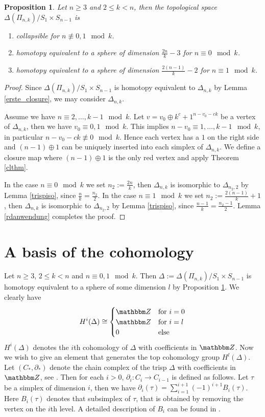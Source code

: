 \documentclass{elsarticle}
\newtheorem{prop}[df]{Proposition}
\def\Z{\mathbbm Z}
\begin{document}
\begin{prop}
\label{mainresult}
Let $n\geq3$ and $2\leq k<n$, then the topological space $\Delta(\Pi_{n,k})/S_1\times S_{n-1}$ is
\begin{enumerate}
\item collapsible for $n\not\equiv 0,1\mod k$.
\item homotopy equivalent to a sphere of dimension $\frac{2n}k-3$ for $n\equiv 0\mod k$.
\item homotopy equivalent to a sphere of dimension $\frac{2(n-1)}k-2$ for $n\equiv 1\mod k$.
\end{enumerate}
\end{prop}
\begin{proof}
Since $\Delta(\Pi_{n,k})/S_1\times S_{n-1}$ is homotopy equivalent to $\Delta_{n,k}$ by Lemma \ref{erste_closure}, we may consider $\Delta_{n,k}$.

Assume we have  $n\equiv 2,\dots,k-1\mod k$. Let $v=v_0\oplus k^c+1^{n-v_0-ck}$ be a vertex of $\Delta_{n,k}$, then we have $v_0\equiv 0,1\mod k$. This implies $n-v_0\equiv 1,\dots,k-1\mod k$, in particular $n-v_0-ck\not\equiv 0\mod k$. Hence each vertex has a $1$ on the right side and $(n-1)\oplus 1$ can be uniquely inserted into each simplex of $\Delta_{n,k}$. We define a closure map where $(n-1)\oplus 1$ is the only red vertex and apply Theorem \ref{clthm}.

In the case $n\equiv 0\mod k$ we set $n_2:=\frac{2n}k$, then $\Delta_{n,k}$ is isomorphic to $\Delta_{n_2,2}$ by Lemma \ref{trispiso}, since $\frac nk=\frac{n_2}2$. In the case $n\equiv 1\mod k$ we set $n_2:=\frac{2(n-1)}k+1$, then $\Delta_{n,k}$ is isomorphic to $\Delta_{n_2,2}$ by Lemma \ref{trispiso}, since $\frac {n-1}k=\frac{n_2-1}2$. Lemma \ref{rdanwendung} completes the proof.
\end{proof}
\section{A basis of the cohomology}
Let $n\geq3$, $2\leq k<n$ and $n\equiv 0,1\mod k$. Then $\Delta:=\Delta(\Pi_{n,k})/S_1\times S_{n-1}$ is homotopy equivalent to a sphere of some dimension $l$ by Proposition \ref{mainresult}. We clearly have 
\[
H^i(\Delta)\cong
\begin{cases}
\Z&\text{for $i=0$}\\
\Z&\text{for $i=l$}\\
0&\text{else}
\end{cases}
\]
$H^i(\Delta)$ denotes the $i$th cohomology of $\Delta$ with coefficients in $\Z$. Now we wish to give an element that generates the top cohomology group $H^l(\Delta)$. Let $(C_*,\partial_*)$ denote the chain complex of the trisp $\Delta$ with coefficients in $\Z$, see \cite[Chapter 3]{buch}. Then for each $i>0$, $\partial_i:C_i\longrightarrow C_{i-1}$ is defined as follows. Let $\tau$ be a simplex of dimension $i$, then we have $\partial_i(\tau)=\sum_{i=1}^{i+1}(-1)^{i+1}B_i(\tau)$. Here $B_i(\tau)$ denotes that subsimplex of $\tau$, that is obtained by removing the vertex on the $i$th level. A detailed description of $B_i$ can be found in \cite{buch}.
\end{document}
